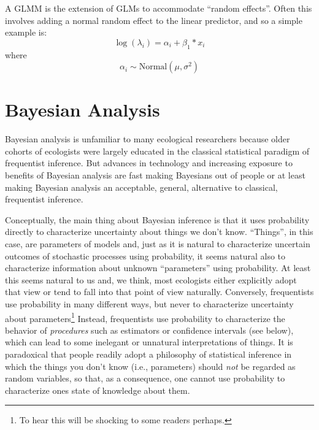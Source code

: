 A GLMM is the extension of GLMs to accommodate ``random
effects''. Often this involves adding a normal random effect to the
linear predictor, and so a simple example is:
\[
 \log(\lambda_{i}) = \alpha_{i} + \beta_{1}*x_{i}
\]
where
\[
 \alpha_{i} \sim \mbox{Normal}(\mu,\sigma^{2})
\]



\section{Bayesian Analysis}

Bayesian analysis is unfamiliar to many ecological researchers because
older cohorts of ecologists were largely educated in the classical
statistical paradigm of frequentist inference. But advances in
technology and increasing exposure to benefits of Bayesian analysis
are fast making Bayesians out of people or at least making Bayesian
analysis an acceptable, general, alternative to classical, frequentist
inference.

Conceptually, the main thing about Bayesian inference is that it uses
probability directly to characterize uncertainty about things we don't
know.  ``Things'', in this case, are parameters of models and, just as
it is natural to characterize uncertain outcomes of stochastic
processes using probability, it seems natural also to characterize
information about unknown ``parameters'' using probability. At least
this seems natural to us and, we think, most ecologists either
explicitly adopt that view or tend to fall into that point of view
naturally.  Conversely, frequentists use probability in many different
ways, but never to characterize uncertainty about
parameters\footnote{To hear this will be shocking to some readers
  perhaps.} Instead, frequentists use probability to characterize the
behavior of {\it procedures} such as estimators or confidence
intervals (see below), which can lead to some inelegant or unnatural
interpretations of things.  It is paradoxical that people readily
adopt a philosophy of statistical inference in which the things you
don't know (i.e., parameters) should {\it not} be regarded as random
variables, so that, as a consequence, one cannot use probability to
characterize ones state of knowledge about them.


